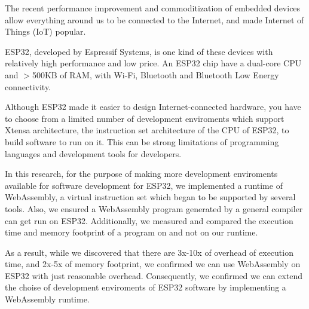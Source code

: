 \begin{eabstract}

The recent performance improvement and commoditization of embedded devices
allow everything around us to be connected to the Internet, and made Internet
of Things (IoT) popular.

ESP32, developed by Espressif Systems, is one kind of these devices with
relatively high performance and low price.
An ESP32 chip have a dual-core CPU and $>$500KB of RAM, with Wi-Fi, Bluetooth
and Bluetooth Low Energy connectivity.

Although ESP32 made it easier to design Internet-connected hardware, you have to
choose from a limited number of development enviroments which support Xtensa
architecture, the instruction set architecture of the CPU of ESP32, to build
software to run on it.
This can be strong limitations of programming languages and development tools for
developers.

In this research, for the purpose of making more development enviroments
available for software development for ESP32, we implemented a runtime of
WebAssembly, a virtual instruction set which began to be supported by several
tools.
Also, we ensured a WebAssembly program generated by a general compiler can get
run on ESP32.
Additionally, we measured and compared the execution time and memory footprint
of a program on and not on our runtime.

As a result, while we discovered that there are 3x-10x of overhead of execution
time, and 2x-5x of memory footprint, we confirmed we can use WebAssembly on ESP32
with just reasonable overhead.
Consequently, we confirmed we can extend the choise of development enviroments
of ESP32 software by implementing a WebAssembly runtime.

\end{eabstract}
